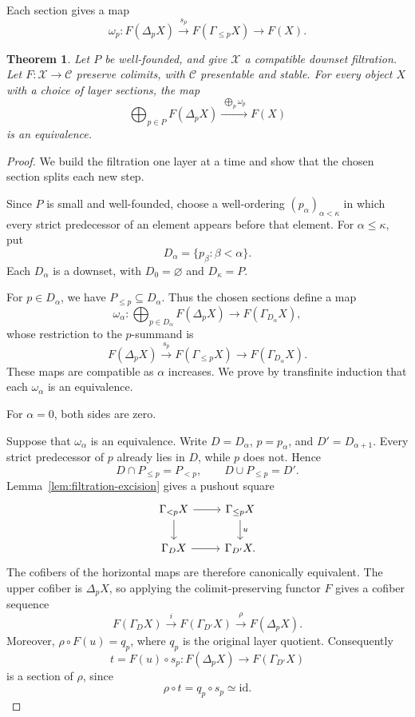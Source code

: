 \documentclass[11pt,reqno]{amsart}
\newtheorem{theorem}{Theorem}[section]
\theoremstyle{definition}
\theoremstyle{remark}
\theoremstyle{plain}
\numberwithin{equation}{section}
\begin{document}
Each section gives a map
\[
 \omega_p:
 F(\Delta_pX)\xrightarrow{s_p}F(\Gamma_{\leq p}X)
 \longrightarrow F(X).
\]

\begin{theorem}
\label{thm:layer-splitting}
Let \(P\) be well-founded, and give \(\mathcal X\) a compatible
downset filtration. Let \(F:\mathcal X\to\mathcal C\) preserve
colimits, with \(\mathcal C\) presentable and stable.
For every object \(X\) with a choice of layer sections, the map
\begin{equation}
\label{eq:layer-splitting}
 \bigoplus_{p\in P}F(\Delta_pX)
 \xrightarrow{\ \bigoplus_p\omega_p\ }F(X)
\end{equation}
is an equivalence.
\end{theorem}

\begin{proof}
We build the filtration one layer at a time and show that the
chosen section splits each new step.

Since \(P\) is small and well-founded, choose a well-ordering
\((p_\alpha)_{\alpha<\kappa}\) in which every strict predecessor
of an element appears before that element. For \(\alpha\leq\kappa\), put
\[
 D_\alpha=\{p_\beta:\beta<\alpha\}.
\]
Each \(D_\alpha\) is a downset, with
\(D_0=\varnothing\) and \(D_\kappa=P\).

For \(p\in D_\alpha\), we have \(P_{\leq p}\subseteq D_\alpha\).
Thus the chosen sections define a map
\[
 \omega_\alpha:
 \bigoplus_{p\in D_\alpha}F(\Delta_pX)
 \longrightarrow F(\Gamma_{D_\alpha}X),
\]
whose restriction to the \(p\)-summand is
\[
 F(\Delta_pX)\xrightarrow{s_p}
 F(\Gamma_{\leq p}X)\longrightarrow F(\Gamma_{D_\alpha}X).
\]
These maps are compatible as \(\alpha\) increases. We prove by
transfinite induction that each \(\omega_\alpha\) is an equivalence.

For \(\alpha=0\), both sides are zero.

Suppose that \(\omega_\alpha\) is an equivalence. Write
\(D=D_\alpha\), \(p=p_\alpha\), and \(D'=D_{\alpha+1}\).
Every strict predecessor of \(p\) already lies in \(D\), while
\(p\) does not. Hence
\[
 D\cap P_{\leq p}=P_{<p},
 \qquad
 D\cup P_{\leq p}=D'.
\]
Lemma~\ref{lem:filtration-excision} gives a pushout square
\[
\begin{tikzcd}
 \Gamma_{<p}X \arrow[r] \arrow[d]
   & \Gamma_{\leq p}X \arrow[d,"u"]\\
 \Gamma_DX \arrow[r]
   & \Gamma_{D'}X .
\end{tikzcd}
\]
The cofibers of the horizontal maps are therefore canonically
equivalent. The upper cofiber is \(\Delta_pX\), so applying
the colimit-preserving functor \(F\) gives a cofiber sequence
\[
 F(\Gamma_DX)\xrightarrow{i}
 F(\Gamma_{D'}X)\xrightarrow{\rho}F(\Delta_pX).
\]
Moreover, \(\rho\circ F(u)=q_p\), where \(q_p\) is the original
layer quotient. Consequently
\[
 t=F(u)\circ s_p:
 F(\Delta_pX)\longrightarrow F(\Gamma_{D'}X)
\]
is a section of \(\rho\), since
\[
 \rho\circ t=q_p\circ s_p\simeq\mathrm{id}.
\]


\end{proof}
\end{document}
